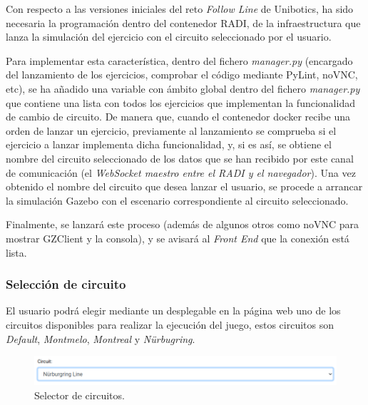 \documentclass[a4paper, 12pt]{book}
\begin{document}
Con respecto a las versiones iniciales del reto \emph{Follow Line} de Unibotics, ha sido necesaria la programación dentro del contenedor RADI, de la infraestructura que lanza la simulación del ejercicio con el circuito seleccionado por el usuario.

Para implementar esta característica, dentro del fichero \emph{manager.py} (encargado del lanzamiento de los ejercicios, comprobar el código mediante PyLint, noVNC, etc), se ha añadido una variable con ámbito global dentro del fichero \emph{manager.py} que contiene una lista con todos los ejercicios que implementan la funcionalidad de cambio de circuito. De manera que, cuando el contenedor docker recibe una orden de lanzar un ejercicio, previamente al lanzamiento se comprueba si el ejercicio a lanzar implementa dicha funcionalidad, y, si es así, se obtiene el nombre del circuito seleccionado de los datos que se han recibido por este canal de comunicación (el \emph{WebSocket maestro entre el RADI y el navegador}). Una vez obtenido el nombre del circuito que desea lanzar el usuario, se procede a arrancar la simulación Gazebo con el escenario correspondiente al circuito seleccionado.

Finalmente, se lanzará este proceso (además de algunos otros como noVNC para mostrar GZClient y la consola), y se avisará al \emph{Front End} que la conexión está lista.

\subsubsection{Selección de circuito}
\label{subsec:follow_line_game_circuito}

El usuario podrá elegir mediante un desplegable en la página web uno de los circuitos disponibles para realizar la ejecución del juego, estos circuitos son \emph{Default}, \emph{Montmelo}, \emph{Montreal} y \emph{Nürbugring}. 

\begin{figure}[H]
	\centering
    \includegraphics[width=15cm]{img/circuit_selector.png}
    \caption{Selector de circuitos.}
    \label{figura:circuit_selector}
\end{figure}

\end{document}
